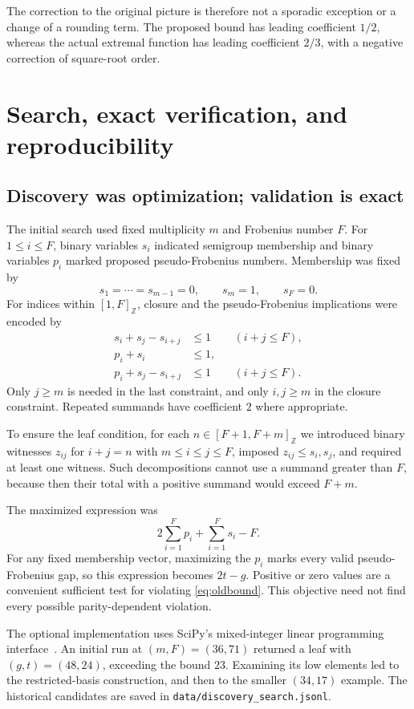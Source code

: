 \documentclass[11pt,letterpaper]{article}
\numberwithin{equation}{section}
\theoremstyle{definition}
\theoremstyle{remark}
\newcommand{\Z}{\mathbb Z}
\newcommand{\ints}[2]{[#1,#2]_{\Z}}
\begin{document}
The correction to the original picture is therefore not a sporadic
exception or a change of a rounding term. The proposed bound has leading
coefficient $1/2$, whereas the actual extremal function has leading
coefficient $2/3$, with a negative correction of square-root order.

\section{Search, exact verification, and reproducibility}\label{sec:computation}

\subsection{Discovery was optimization; validation is exact}

The initial search used fixed multiplicity $m$ and Frobenius number $F$.
For $1\le i\le F$, binary variables $s_i$ indicated semigroup membership
and binary variables $p_i$ marked proposed pseudo-Frobenius numbers.
Membership was fixed by
\[
 s_1=\cdots=s_{m-1}=0,\qquad s_m=1,\qquad s_F=0.
\]
For indices within $\ints{1}{F}$, closure and the pseudo-Frobenius
implications were encoded by
\begin{align*}
 s_i+s_j-s_{i+j}&\le1&& (i+j\le F),\\
 p_i+s_i&\le1,\\
 p_i+s_j-s_{i+j}&\le1&& (i+j\le F).
\end{align*}
Only $j\ge m$ is needed in the last constraint, and only $i,j\ge m$ in
the closure constraint. Repeated summands have coefficient $2$ where
appropriate.

To ensure the leaf condition, for each $n\in\ints{F+1}{F+m}$ we introduced
binary witnesses $z_{ij}$ for $i+j=n$ with $m\le i\le j\le F$, imposed
$z_{ij}\le s_i,s_j$, and required at least one witness. Such decompositions
cannot use a summand greater than $F$, because then their total with a
positive summand would exceed $F+m$.

The maximized expression was
\[
 2\sum_{i=1}^F p_i+\sum_{i=1}^F s_i-F.
\]
For any fixed membership vector, maximizing the $p_i$ marks every valid
pseudo-Frobenius gap, so this expression becomes $2t-g$. Positive or zero
values are a convenient sufficient test for violating \eqref{eq:oldbound}.
This objective need not find every possible parity-dependent violation.

The optional implementation uses SciPy's mixed-integer linear programming
interface~\cite{SciPy}. An initial run at $(m,F)=(36,71)$ returned a leaf
with $(g,t)=(48,24)$, exceeding the bound $23$. Examining its low elements
led to the restricted-basis construction, and then to the smaller
$(34,17)$ example. The historical candidates are saved in
\texttt{data/discovery\_search.jsonl}.
\end{document}
